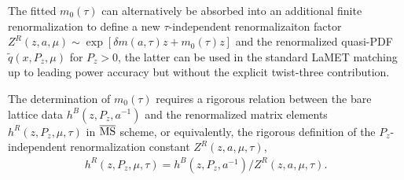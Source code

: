 \documentclass[prd,aps,nofootinbib,superscriptaddress,floatfix,preprintnumbers,twocolumn]{revtex4}
\begin{document}
The fitted $m_0(\tau)$ can alternatively be absorbed into an additional finite renormalization to define a new $\tau$-independent renormalizaiton factor $Z^R(z,a,\mu)\sim \exp[\delta m(a,\tau)z+ m_0(\tau)z]$ and the renormalized quasi-PDF $\tilde{q}(x,P_z,\mu)$ for $P_z>0$, the latter can be used in the standard LaMET matching up to leading power accuracy but without the explicit twist-three contribution. 

The determination of $m_0(\tau)$ requires a rigorous relation between the bare lattice data $h^B(z,P_z,a^{-1})$ and the renormalized matrix elements $h^R(z,P_z,\mu,\tau)$ in $\overline{\rm MS}$ scheme, or equivalently, the rigorous definition of the $P_z$-independent renormalization constant $Z^R(z,a,\mu,\tau)$,
\begin{align}
    h^R(z,P_z,\mu,\tau)=h^B(z,P_z,a^{-1})/Z^R(z,a,\mu,\tau).
\end{align}
\end{document}
